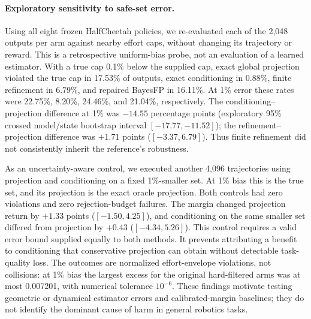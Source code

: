 \paragraph{Exploratory sensitivity to safe-set error.}
Using all eight frozen HalfCheetah policies, we re-evaluated each of the 2,048
outputs per arm against nearby effort caps, without changing its trajectory
or reward. This is a retrospective uniform-bias probe, not an evaluation of a
learned estimator. With a true cap 0.1\% below the supplied cap, exact global
projection violated the true cap in 17.53\% of outputs, exact conditioning in
0.88\%, finite refinement in 6.79\%, and repaired BayesFP in 16.11\%.
At 1\% error these rates were 22.75\%, 8.20\%, 24.46\%, and 21.04\%, respectively.
The conditioning--projection difference at 1\% was $-14.55$ percentage points
(exploratory 95\% crossed model/state bootstrap interval $[-17.77,-11.52]$);
the refinement--projection difference was $+1.71$ points ($[-3.37,6.79]$).
Thus finite refinement did not consistently inherit the reference's robustness.

As an uncertainty-aware control, we executed another 4,096 trajectories using
projection and conditioning on a fixed 1\%-smaller set. At 1\% bias this is the
true set, and its projection is the exact oracle projection. Both controls had
zero violations and zero rejection-budget failures. The margin changed projection
return by $+1.33$ points ($[-1.50,4.25]$), and conditioning on the same smaller set
differed from projection by $+0.43$ ($[-4.34,5.26]$). This control requires a valid
error bound supplied equally to both methods. It prevents attributing a benefit
to conditioning that conservative projection can obtain without detectable
task-quality loss. The outcomes are normalized effort-envelope violations,
not collisions: at 1\% bias the largest excess for the original hard-filtered
arms was at most 0.007201, with numerical tolerance $10^{-6}$.
These findings motivate testing geometric or dynamical estimator errors and
calibrated-margin baselines; they do not identify the dominant cause of harm
in general robotics tasks.
